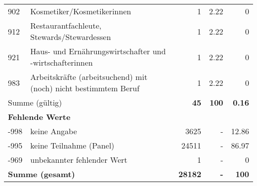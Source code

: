 \begin{longtable}{lXrrr}
        902 & \multicolumn{1}{X}{Kosmetiker/Kosmetikerinnen} & %
          \num{1} &
          \num[round-mode=places,round-precision=2]{2.22} &
          \num[round-mode=places,round-precision=2]{0} \\

        912 & \multicolumn{1}{X}{Restaurantfachleute, Stewards/Stewardessen} & %
          \num{1} &
          \num[round-mode=places,round-precision=2]{2.22} &
          \num[round-mode=places,round-precision=2]{0} \\

        921 & \multicolumn{1}{X}{Haus- und Ernährungswirtschafter und -wirtschafterinnen} & %
          \num{1} &
          \num[round-mode=places,round-precision=2]{2.22} &
          \num[round-mode=places,round-precision=2]{0} \\

        983 & \multicolumn{1}{X}{Arbeitskräfte (arbeitsuchend) mit (noch) nicht bestimmtem Beruf} & %
          \num{1} &
          \num[round-mode=places,round-precision=2]{2.22} &
          \num[round-mode=places,round-precision=2]{0} \\

     \midrule
     \multicolumn{2}{l}{Summe (gültig)} &
       \textbf{\num{45}} &
     \textbf{\num{100}} &
       \textbf{\num[round-mode=places,round-precision=2]{0.16}} \\
     \multicolumn{5}{l}{\textbf{Fehlende Werte}}\\
       -998 &
       keine Angabe &
         \num{3625} &
        - &
         \num[round-mode=places,round-precision=2]{12.86} \\
       -995 &
       keine Teilnahme (Panel) &
         \num{24511} &
        - &
         \num[round-mode=places,round-precision=2]{86.97} \\
       -969 &
       unbekannter fehlender Wert &
         \num{1} &
        - &
         \num[round-mode=places,round-precision=2]{0} \\
     \midrule
     \multicolumn{2}{l}{\textbf{Summe (gesamt)}} &
          \textbf{\num{28182}} &
        \textbf{-} &
        \textbf{\num{100}} \\
     \bottomrule
     \end{longtable}
     
